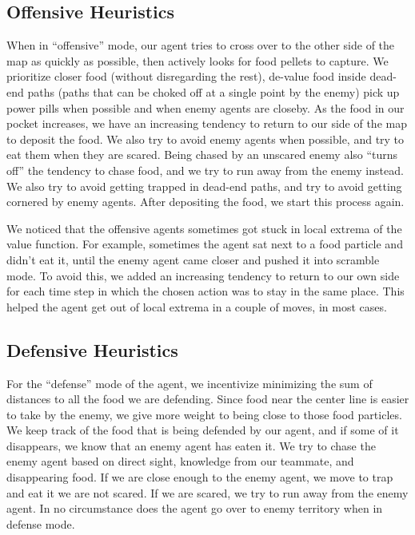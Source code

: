 \documentclass[a4paper,12pt]{article}
\begin{document}
\subsection{Offensive Heuristics}
\label{subsec:offensive_heuristics}
When in ``offensive'' mode, our agent tries to cross over to the other side of the map as quickly as possible, then actively looks for food pellets to capture. We prioritize closer food (without disregarding the rest), de-value food inside dead-end paths (paths that can be choked off at a single point by the enemy) pick up power pills when possible and when enemy agents are closeby. As the food in our pocket increases, we have an increasing tendency to return to our side of the map to deposit the food. We also try to avoid enemy agents when possible, and try to eat them when they are scared. Being chased by an unscared enemy also ``turns off'' the tendency to chase food, and we try to run away from the enemy instead. We also try to avoid getting trapped in dead-end paths, and try to avoid getting cornered by enemy agents. After depositing the food, we start this process again.

We noticed that the offensive agents sometimes got stuck in local extrema of the value function. For example, sometimes the agent sat next to a food particle and didn't eat it, until the enemy agent came closer and pushed it into scramble mode. To avoid this, we added an increasing tendency to return to our own side for each time step in which the chosen action was to stay in the same place. This helped the agent get out of local extrema in a couple of moves, in most cases.

\subsection{Defensive Heuristics}
\label{subsec:defensive_heuristics}

For the ``defense'' mode of the agent, we incentivize minimizing the sum of distances to all the food we are defending. Since food near the center line is easier to take by the enemy, we give more weight to being close to those food particles. We keep track of the food that is being defended by our agent, and if some of it disappears, we know that an enemy agent has eaten it. We try to chase the enemy agent based on direct sight, knowledge from our teammate, and disappearing food. If we are close enough to the enemy agent, we move to trap and eat it we are not scared. If we are scared, we try to run away from the enemy agent. In no circumstance does the agent go over to enemy territory when in defense mode.
\end{document}
